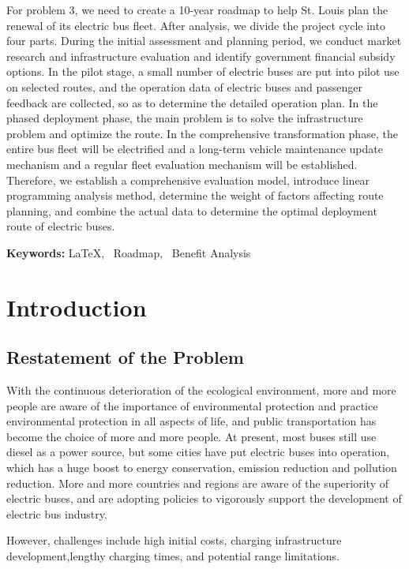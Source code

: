 \documentclass[12pt]{article}
\begin{document}
For problem 3, we need to create a 10-year roadmap to help St. Louis plan the renewal of its electric bus fleet. 
After analysis, we divide the project cycle into four parts. During the initial assessment and planning period, we conduct market 
research and infrastructure evaluation and identify government financial subsidy options. In the pilot stage, a small number of 
electric buses are put into pilot use on selected routes, and the operation data of electric buses and passenger feedback are 
collected, so as to determine the detailed operation plan. In the phased deployment phase, the main problem is to solve the 
infrastructure problem and optimize the route. In the comprehensive transformation phase, the entire bus fleet will be electrified 
and a long-term vehicle maintenance update mechanism and a regular fleet evaluation mechanism will be established. Therefore, 
we establish a comprehensive evaluation model, introduce linear programming analysis method, determine the weight of factors 
affecting route planning, and combine the actual data to determine the optimal deployment route of electric buses.


\vspace{0.4cm}
\noindent \textbf{Keywords: }\LaTeX,~  Roadmap,~ Benefit Analysis

\newpage
\tableofcontents
\thispagestyle{empty}
\newpage

\pagestyle{fancy}
\setcounter{page}{1}
\section{Introduction}
\subsection{Restatement of the Problem}
With the continuous deterioration of the ecological environment, more and more people are aware of the importance of environmental 
protection and practice environmental protection in all aspects of life, and public transportation has become the choice of more 
and more people. At present, most buses still use diesel as a power source, but some cities have put electric buses into operation, 
which has a huge boost to energy conservation, emission reduction and pollution reduction. More and more countries and regions are 
aware of the superiority of electric buses, and are adopting policies to vigorously support the development of electric bus industry.

However, challenges include high initial costs, charging infrastructure development,lengthy charging times, and potential range 
limitations.
\end{document}
